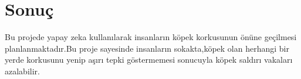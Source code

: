 \documentclass[12pt,a4paper]{article}
\begin{document}
		\section{Sonuç}
		Bu projede yapay zeka kullanılarak insanların köpek korkusunun önüne geçilmesi planlanmaktadır.Bu proje sayesinde insanların sokakta,köpek olan herhangi bir yerde korkusunu yenip aşırı tepki göstermemesi sonucuyla köpek saldırı vakaları azalabilir.
	\newline \newline \newline
	
	 
\end{document}
